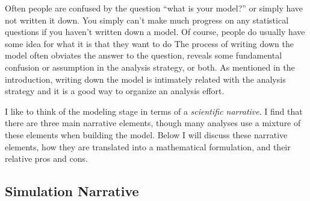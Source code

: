 \documentclass{cernrep}
\begin{document}

Often people are confused by the question ``what is your model?'' or simply have not written it down.  You simply can't make much progress on any statistical questions if you haven't written down a model.  Of course, people do usually have some idea for what it is that they want to do The process of writing down the model often obviates the answer to the question, reveals some fundamental confusion or assumption in the analysis strategy, or both.  As mentioned in the introduction, writing down the model is intimately related with the analysis strategy and it is a good way to organize an analysis effort.

I like to think of the modeling stage in terms of a  \textit{scientific narrative}.  I find that there are three main narrative elements, though many analyses use a mixture of these elements when building the model.  Below I will discuss these narrative elements, how they are translated into a mathematical formulation, and their relative pros and cons.

\subsection{Simulation Narrative}
\end{document}
